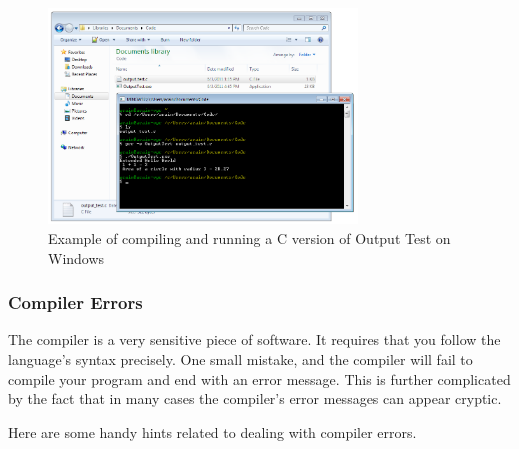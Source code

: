 \begin{figure}[h]
   \centering
   \includegraphics[width=0.73\textwidth]{./topics/program-creation/images/WindowsCompleteExample1} 
   \caption{Example of compiling and running a C version of Output Test on Windows}
   \label{fig:program-creation-complete-windows-version-1}
\end{figure}

\clearpage
\subsubsection{Compiler Errors} %
\label{ssub:compiler_errors}

The compiler is a very sensitive piece of software. It requires that you follow the language's syntax precisely. One small mistake, and the compiler will fail to compile your program and end with an error message. This is further complicated by the fact that in many cases the compiler's error messages can appear cryptic.

Here are some handy hints related to dealing with compiler errors.

